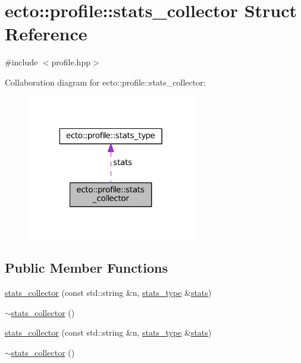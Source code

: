 \hypertarget{structecto_1_1profile_1_1stats__collector}{\section{ecto\-:\-:profile\-:\-:stats\-\_\-collector Struct Reference}
\label{structecto_1_1profile_1_1stats__collector}
}


{\ttfamily \#include $<$profile.\-hpp$>$}



Collaboration diagram for ecto\-:\-:profile\-:\-:stats\-\_\-collector\-:\nopagebreak
\begin{figure}[H]
\begin{center}
\leavevmode
\includegraphics[width=208pt]{structecto_1_1profile_1_1stats__collector__coll__graph}
\end{center}
\end{figure}
\subsection*{Public Member Functions}
\begin{DoxyCompactItemize}
\item 
\hyperlink{structecto_1_1profile_1_1stats__collector_adae561b196f7ec50f42ba76031924ee4}{stats\-\_\-collector} (const std\-::string \&n, \hyperlink{structecto_1_1profile_1_1stats__type}{stats\-\_\-type} \&\hyperlink{structecto_1_1profile_1_1stats__collector_a1814bc20f4bd96a974fa629249816603}{stats})
\item 
\hyperlink{structecto_1_1profile_1_1stats__collector_aa1521de3406025190b06d0b7bad33064}{$\sim$stats\-\_\-collector} ()
\item 
\hyperlink{structecto_1_1profile_1_1stats__collector_adae561b196f7ec50f42ba76031924ee4}{stats\-\_\-collector} (const std\-::string \&n, \hyperlink{structecto_1_1profile_1_1stats__type}{stats\-\_\-type} \&\hyperlink{structecto_1_1profile_1_1stats__collector_a1814bc20f4bd96a974fa629249816603}{stats})
\item 
\hyperlink{structecto_1_1profile_1_1stats__collector_aa1521de3406025190b06d0b7bad33064}{$\sim$stats\-\_\-collector} ()
\end{DoxyCompactItemize}

